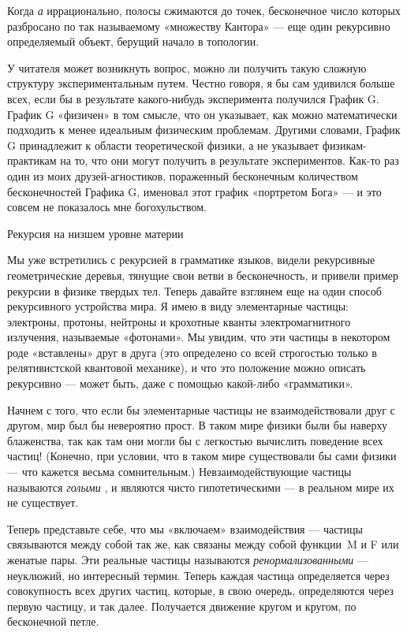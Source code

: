 Когда \emph{а} иррационально, полосы сжимаются до точек, бесконечное число которых разбросано по так называемому «множеству Кантора» --- еще один рекурсивно определяемый объект, берущий начало в топологии.

У читателя может возникнуть вопрос, можно ли получить такую сложную структуру экспериментальным путем. Честно говоря, я бы сам удивился больше всех, если бы в результате какого-нибудь эксперимента получился График G. График G «физичен» в том смысле, что он указывает, как можно математически подходить к менее идеальным физическим проблемам. Другими словами, График G принадлежит к области теоретической физики, а не указывает физикам-практикам на то, что они могут получить в результате экспериментов. Как-то раз один из моих друзей-агностиков, пораженный бесконечным количеством бесконечностей Графика G, именовал этот график «портретом Бога» --- и это совсем не показалось мне богохульством.

Рекурсия на низшем уровне материи

Мы уже встретились с рекурсией в грамматике языков, видели рекурсивные геометрические деревья, тянущие свои ветви в бесконечность, и привели пример рекурсии в физике твердых тел. Теперь давайте взглянем еще на один способ рекурсивного устройства мира. Я имею в виду элементарные частицы: электроны, протоны, нейтроны и крохотные кванты электромагнитного излучения, называемые «фотонами». Мы увидим, что эти частицы в некотором роде «вставлены» друг в друга (это определено со всей строгостью только в релятивистской квантовой механике), и что это положение можно описать рекурсивно --- может быть, даже с помощью какой-либо «грамматики».

Начнем с того, что если бы элементарные частицы не взаимодействовали друг с другом, мир был бы невероятно прост. В таком мире физики были бы наверху блаженства, так как там они могли бы с легкостью вычислить поведение всех частиц! (Конечно, при условии, что в таком мире существовали бы сами физики --- что кажется весьма сомнительным.) Невзаимодействующие частицы называются \emph{голыми} , и являются чисто гипотетическими --- в реальном мире их не существует.

Теперь представьте себе, что мы «включаем» взаимодействия --- частицы связываются между собой так же, как связаны между собой функции~M и F или женатые пары. Эти реальные частицы называются \emph{ренормализованными} --- неуклюжий, но интересный термин. Теперь каждая частица определяется через совокупность всех других частиц, которые, в свою очередь, определяются через первую частицу, и так далее. Получается движение кругом и кругом, по бесконечной петле.

